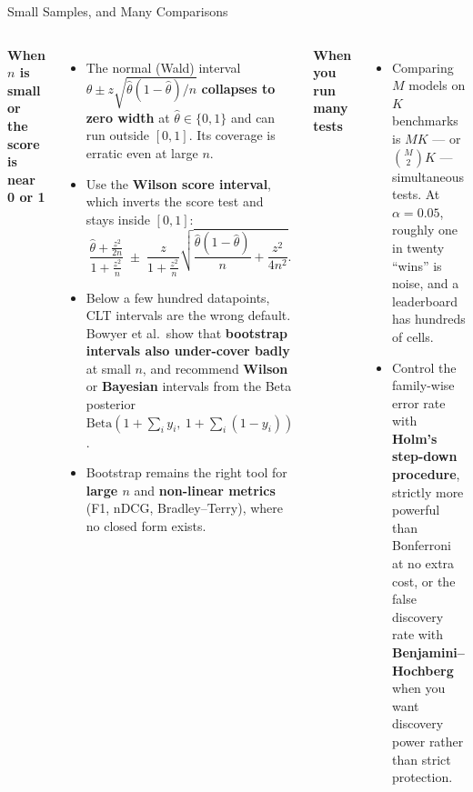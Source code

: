 \begin{frame}{Small Samples, and Many Comparisons}
  \begin{columns}[T,onlytextwidth]
      {\scriptsize \textbf{When $n$ is small or the score is near 0 or 1}}
      \begin{itemize}\scriptsize\itemsep0.05em
        \item[\textcolor{red}{$\blacktriangleright$}] The normal (Wald) interval $\hat{\theta} \pm z\sqrt{\hat{\theta}(1-\hat{\theta})/n}$ \textbf{collapses to zero width} at $\hat{\theta} \in \{0,1\}$ and can run outside $[0,1]$. Its coverage is erratic even at large $n$.
        \item[\textcolor{red}{$\blacktriangleright$}] Use the \textbf{Wilson score interval}, which inverts the score test and stays inside $[0,1]$:
          \[
            \frac{\hat{\theta} + \frac{z^2}{2n}}{1 + \frac{z^2}{n}}
            \;\pm\;
            \frac{z}{1 + \frac{z^2}{n}}
            \sqrt{\frac{\hat{\theta}(1-\hat{\theta})}{n} + \frac{z^2}{4n^2}}.
          \]
        \item[\textcolor{red}{$\blacktriangleright$}] Below a few hundred datapoints, CLT intervals are the wrong default. Bowyer et al.\ show that \textbf{bootstrap intervals also under-cover badly} at small $n$, and recommend \textbf{Wilson} or \textbf{Bayesian} intervals from the Beta posterior
          $\mathrm{Beta}\!\left(1 + \sum_i y_i,\ 1 + \sum_i (1 - y_i)\right)$.
        \item[\textcolor{red}{$\blacktriangleright$}] Bootstrap remains the right tool for \textbf{large $n$} and \textbf{non-linear metrics} (F1, nDCG, Bradley--Terry), where no closed form exists.
      \end{itemize}
      {\scriptsize \textbf{When you run many tests}}
      \begin{itemize}\scriptsize\itemsep0.05em
        \item[\textcolor{red}{$\blacktriangleright$}] Comparing $M$ models on $K$ benchmarks is $MK$ --- or $\binom{M}{2}K$ --- simultaneous tests. At $\alpha = 0.05$, roughly one in twenty ``wins'' is noise, and a leaderboard has hundreds of cells.
        \item[\textcolor{red}{$\blacktriangleright$}] Control the family-wise error rate with \textbf{Holm's step-down procedure}, strictly more powerful than Bonferroni at no extra cost, or the false discovery rate with \textbf{Benjamini--Hochberg} when you want discovery power rather than strict protection.

\end{itemize}
\end{columns}
\end{frame}
